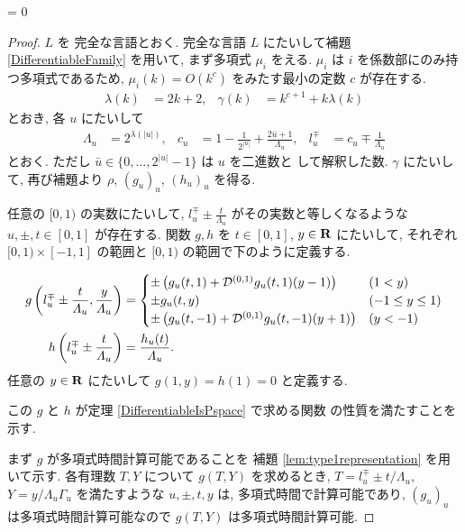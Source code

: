 \ifnum \proc = 0
\begin{proof}
 $L$ を \PSPACE 完全な言語とおく.
 \PSPACE 完全な言語 $L$ にたいして補題 \ref{DifferentiableFamily} を用いて,
 まず多項式 $\mu_i$ をえる.
 $\mu_i$ は $i$ を係数部にのみ持つ多項式であるため,
 $\mu_i(k) = O(k^c)$ をみたす最小の定数 $c$ が存在する.
 \begin{align}
  \lambda(k) &= 2k + 2,&
  \gamma(k) &= k^{c+1} + k \lambda(k)
 \end{align}
 とおき, 各 $u$ にたいして 
\begin{align}
 \Lambda_u 
 &= 2^{\lambda(|u|)}, &
 c_u 
 &= 1-\frac{1}{2^{|u|}}+\frac{2\bar{u}+1}{\Lambda_u}, &
 l_u^\mp 
 &= c_u\mp\frac{1}{\varLambda_u} 
\end{align}  
 とおく. ただし $\bar u \in \{0, \dots, 2^{|u|} - 1\}$ は $u$ を二進数と
 して解釈した数.
 $\gamma$ にたいして, 再び補題より $\rho$, $(g_u)_u$, $(h_u)_u$ を得る.



 任意の $[0,1)$ の実数にたいして,
 $l^\mp_u \pm \frac{t}{\Lambda_u}$ がその実数と等しくなるような
 $u, \pm, t\in [0,1]$ が存在する.
 関数 $g, h$ を $t \in [0,1]$, $y \in \mathbf R$ にたいして,
 それぞれ $[0,1) \times [-1,1]$ の範囲と $[0,1)$ の範囲で下のように定義する.

 \begin{align}
  g\left(l^\mp_u \pm \frac{t}{\varLambda_u}, \frac{y}{\varLambda_u}\right)
  &= \begin{cases}
      \pm \left( g_u(t,1) 
      + \mathcal D^{(0,1)}g_u(t, 1)(y-1) \right)&  (1<y)\\
      \pm g_u(t, y) & (-1 \le y \le 1) \\
      \pm \left( g_u(t, -1) + \mathcal D^{(0,1)} g_u(t, -1)(y+1) \right) & (y<-1)
     \end{cases}
  \\
  h \left( l^\mp_u \pm \frac{t}{\varLambda_u} \right) 
  &= \frac{h_u(t)}{\varLambda_u}.
\end{align}
 任意の $y \in \mathbf R$ にたいして $g(1,y) = h(1) = 0$ と定義する.



 この $g$ と $h$ が定理 \ref{DifferentiableIsPspace} で求める関数
 の性質を満たすことを示す.


 
 まず $g$ が多項式時間計算可能であることを
 補題 \ref{lem:type1representation} を用いて示す.
 各有理数 $T,Y$ について $g(T, Y)$ を求めるとき,
 $T=l_u^\mp \pm t/\Lambda_u$, $Y = y/\Lambda_u\Gamma_u$ を満たすような
 $u, \pm, t, y$ は, 多項式時間で計算可能であり,
 $(g_u)_u$ は多項式時間計算可能なので $g(T, Y)$ は多項式時間計算可能.




\end{proof}
